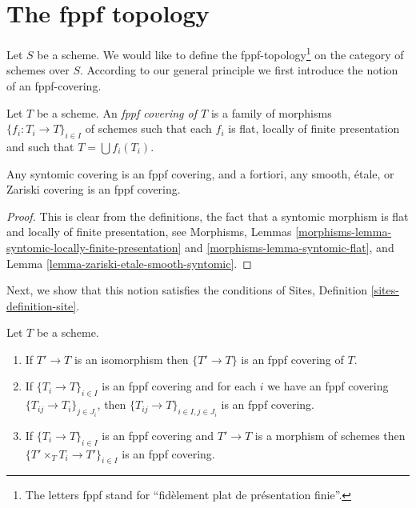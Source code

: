 \section{The fppf topology}
\label{section-fppf}

\noindent
Let $S$ be a scheme. We would like to define the fppf-topology\footnote{
The letters fppf stand for ``fid\`element plat de pr\'esentation finie''.} on
the category of schemes over $S$. According to our general principle
we first introduce the notion of an fppf-covering.

\begin{definition}
\label{definition-fppf-covering}
Let $T$ be a scheme. An {\it fppf covering of $T$} is a family
of morphisms $\{f_i : T_i \to T\}_{i \in I}$ of schemes
such that each $f_i$ is flat, locally of finite presentation and such
that $T = \bigcup f_i(T_i)$.
\end{definition}

\begin{lemma}
\label{lemma-zariski-etale-smooth-syntomic-fppf}
Any syntomic covering is an fppf covering, and a fortiori,
any smooth, \'etale, or Zariski covering is an fppf covering.
\end{lemma}

\begin{proof}
This is clear from the definitions, the fact that a syntomic morphism
is flat and locally of finite presentation, see
Morphisms, Lemmas
\ref{morphisms-lemma-syntomic-locally-finite-presentation} and
\ref{morphisms-lemma-syntomic-flat},
and
Lemma \ref{lemma-zariski-etale-smooth-syntomic}.
\end{proof}

\noindent
Next, we show that this notion satisfies the conditions of
Sites, Definition \ref{sites-definition-site}.

\begin{lemma}
\label{lemma-fppf}
Let $T$ be a scheme.
\begin{enumerate}
\item If $T' \to T$ is an isomorphism then $\{T' \to T\}$
is an fppf covering of $T$.
\item If $\{T_i \to T\}_{i\in I}$ is an fppf covering and for each
$i$ we have an fppf covering $\{T_{ij} \to T_i\}_{j\in J_i}$, then
$\{T_{ij} \to T\}_{i \in I, j\in J_i}$ is an fppf covering.
\item If $\{T_i \to T\}_{i\in I}$ is an fppf covering
and $T' \to T$ is a morphism of schemes then
$\{T' \times_T T_i \to T'\}_{i\in I}$ is an fppf covering.
\end{enumerate}
\end{lemma}

